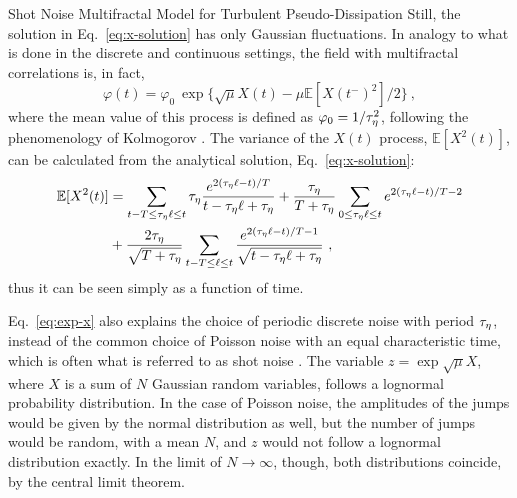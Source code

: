 \begin{chapter}{Shot Noise Multifractal Model for Turbulent Pseudo-Dissipation}
Still, the solution in Eq.~\eqref{eq:x-solution} has only Gaussian fluctuations. In analogy to what is done in the discrete and continuous settings, the field with multifractal correlations is, in fact,
\begin{equation} \label{eq:exp-x}
    \varphi(t) = \varphi_0 \ \exp\{\sqrt{\mu} X(t)
    - \mu \mathbb{E}[X(t^-)^2]/2 \} \ ,
\end{equation}
where the mean value of this process is defined as $\varphi_0 = 1/\tau_{\eta}^2$, following the phenomenology of Kolmogorov \parencite{girimaji1990diffusion}.
The variance of the $X(t)$ process, $\mathbb{E}[X^2(t)]$, can be calculated from the analytical solution, Eq.~\eqref{eq:x-solution}:
\begin{equation} \label{eq:x2-variance}
\begin{split}
    \mathbb{E}[X^2(t)] &=
    \sum_{t-T \leq \tau_{\eta}\ell \leq t} \tau_{\eta} \frac{e^{2(\tau_{\eta}\ell-t)/T}}{t-\tau_{\eta} \ell + \tau_{\eta}}
    + \frac{\tau_{\eta}}{T + \tau_{\eta}} \sum_{0 \leq \tau_{\eta}\ell \leq t} e^{2(\tau_{\eta}\ell-t)/T-2} \\
    &+ \frac{2 \tau_{\eta}}{\sqrt{T+\tau_{\eta}}} \sum_{t-T \leq \ell \leq t} \frac{e^{2(\tau_{\eta}\ell-t)/T-1}}{\sqrt{t-\tau_{\eta} \ell + \tau_{\eta}}} \ ,
\end{split}
\end{equation}
thus it can be seen simply as a function of time.

Eq.~\eqref{eq:exp-x} also explains the choice of periodic discrete noise with period $\tau_{\eta}$, instead of the common choice of Poisson noise with an equal characteristic time, which is often what is referred to as shot noise \parencite{morgado2016}. The variable $z = \exp{\sqrt{\mu}X}$, where $X$ is a sum of $N$ Gaussian random variables, follows a lognormal probability distribution. In the case of Poisson noise, the amplitudes of the jumps would be given by the normal distribution as well, but the number of jumps would be random, with a mean $N$, and $z$ would not follow a lognormal distribution exactly. In the limit of $N \to \infty$, though, both distributions coincide, by the central limit theorem.


\end{chapter}
